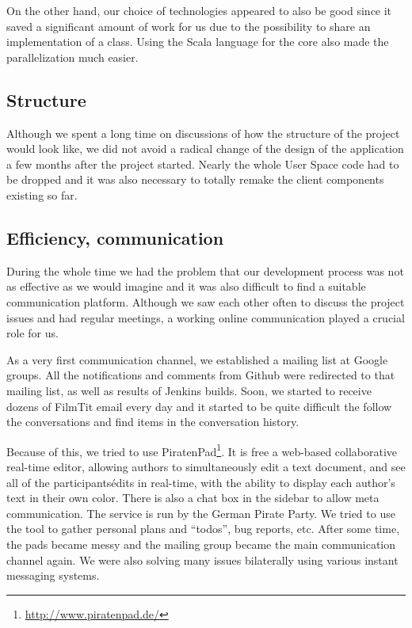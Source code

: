 On the other hand, our choice of technologies appeared to also be good since it saved a significant amount of work for us due to the possibility to share an implementation of a class. Using the Scala language for the core also made the parallelization much easier.

\subsection{Structure}
Although we spent a long time on discussions of how the structure of the project would look like, we did not avoid a radical change of the design of the application a few months after the project started. Nearly the whole User Space code had to be dropped and it was also necessary to totally remake the client components existing so far.

\subsection{Efficiency, communication}
During the whole time we had the problem that our development process was not as effective as we would imagine and it was also difficult to find a suitable communication platform. Although we saw each other often to discuss the project issues and had regular meetings, a working online communication played a crucial role for us.

As a very first communication channel, we established a mailing list at Google groups. All the notifications and comments from Github were redirected to that mailing list, as well as results of Jenkins builds. Soon, we started to receive dozens of FilmTit email every day and it started to be quite difficult the follow the conversations and find items in the conversation history.

Because of this, we tried to use PiratenPad\footnote{\url{http://www.piratenpad.de/}}. It is free a web-based collaborative real-time editor, allowing authors to simultaneously edit a text document, and see all of the participants\' edits in real-time, with the ability to display each author's text in their own color. There is also a chat box in the sidebar to allow meta communication. The service is run by the German Pirate Party. We tried to use the tool to gather personal plans and ``todos'', bug reports, etc. After some time, the pads became messy and the mailing group became the main communication channel again. We were also solving many issues bilaterally using various instant messaging systems.

